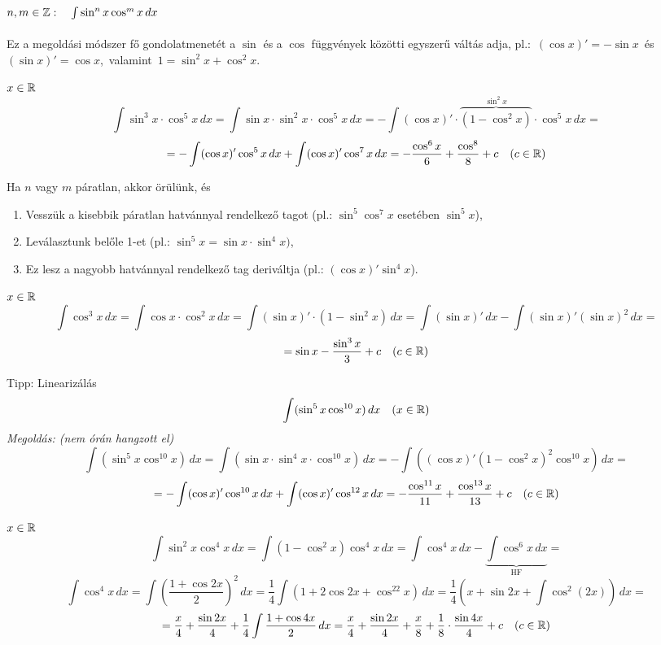 \documentclass[a4paper,11.5pt]{article}
\begin{document}
	\subsection{$n,m\in\mathbb{Z}:\quad \int\sin^n x\cos^mx\,dx$\quad {}\quad}
	\begin{note}
		Ez a megoldási módszer fő gondolatmenetét a $\sin$ és a $\cos$ függvények közötti egyszerű váltás adja, pl.:\, $(\cos x)'=-\sin x$ \,és\, $(\sin x)'=\cos x$, \,valamint \,$1=\sin^2x + \cos^2x$.
	\end{note}
	\begin{task}$x\in\mathbb{R}$
		\[ \int \sin^3x\cdot\cos^5x\,dx=\int\sin x\cdot\sin^2x\cdot\cos^5x\,dx=-\int(\cos x)'\cdot\overbrace{(1-\cos^2 x)}^{\sin^2x}\cdot\cos^5x\,dx=\]
		\[=-\int(\cos x)'\cos^5x\,dx+\int(\cos x)'\cos^7x\,dx=-\frac{\cos^6x}{6}+\frac{\cos^8}{8}+c\quad (c\in\mathbb{R}) \]
	\end{task}
	\begin{note}
		Ha $n$ vagy $m$ páratlan, akkor örülünk, és 
		\begin{enumerate}
			\item Vesszük a kisebbik páratlan hatvánnyal rendelkező tagot (pl.: $\sin^5\cos^7x$ esetében $\sin^5x$),
			\item Leválasztunk belőle 1-et (pl.: $\sin^5x = \sin x\cdot\sin^4 x)$,
			\item Ez lesz a nagyobb hatvánnyal rendelkező tag deriváltja (pl.: $(\cos x)'\sin^4 x$).
		\end{enumerate}
		
	\end{note}
	\begin{task}$x\in\mathbb{R}$
		\[ \int\cos^3x\,dx=\int\cos x\cdot\cos^2x\,dx=\int(\sin x)'\cdot(1-\sin^2x)\,dx=\int(\sin x)'\,dx-\int(\sin x)'(\sin x)^2\,dx=\]
		\[=\sin x-\frac{\sin^3x}{3}+c\quad (c\in\mathbb{R}) \]
	\end{task}
	\begin{exercise} Tipp: Linearizálás 
		\[ \int(\sin^5x\cos^{10}x)\,dx\quad (x\in\mathbb{R}) \]
		\textit{Megoldás: (nem órán hangzott el)}
		\[ \int(\sin^5x\cos^{10}x)\,dx=\int(\sin x\cdot\sin^4x\cdot\cos^{10}x)\,dx=-\int((\cos x)'(1-\cos^2x)^2\cos^{10}x)\,dx=\]
		\[=-\int(\cos x)'\cos^{10}x\,dx+\int(\cos x)'\cos^{12}x\,dx=-\frac{\cos^{11}x}{11}+\frac{\cos^{13}x}{13}+c\quad (c\in\mathbb{R}) \]
	\end{exercise}
	\begin{task}$x\in\mathbb{R}$
		\[ \int\sin^2x\cos^4x\,dx=\int(1-\cos^2x)\cos^4 x\,dx=\int\cos^4 x\,dx-\underbrace{\int\cos^6x\,dx}_{\text{HF}}=\]
		\[\int\cos^4x\,dx=\int\left(\frac{1+\cos2x}{2}\right)^2\,dx=\frac{1}{4}\int(1+2\cos2x+\cos^22x)\,dx=\frac{1}{4}\left(x+\sin2x+\int\cos^2(2x)\right)\,dx=\]
		\[=\frac{x}{4}+\frac{\sin2x}{4}+\frac{1}{4}\int\frac{1+\cos4x}{2}\,dx=\frac{x}{4}+\frac{\sin2x}{4}+\frac{x}{8}+\frac{1}{8}\cdot\frac{\sin4x}{4}+c\quad (c\in\mathbb{R}) \]
		\begin{center}
			\\
		\end{center}
	\end{task}
\end{document}

